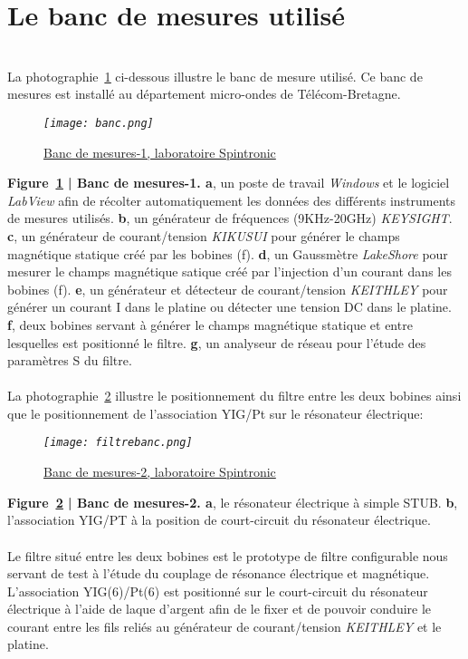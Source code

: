 \documentclass[12pt,fleqn]{book} %
\begin{document}
\section{Le banc de mesures utilisé}
~\\\indent La photographie~\underline{\color{blue}\ref{banc}} ci-dessous illustre le banc de mesure utilisé. Ce banc de mesures est installé au département micro-ondes de Télécom-Bretagne.
\begin{figure}[H]
	\centering
	\itshape
	\texttt{[image: banc.png]}
	\caption{\label{banc} \underline{Banc de mesures-1, laboratoire Spintronic}}
\end{figure}
\noindent\footnotesize  \textbf{Figure~\underline{\color{blue}\ref{banc}} | Banc de mesures-1. a}, un poste de travail \emph{Windows} et le logiciel \emph{LabView} afin de récolter automatiquement les données des différents instruments de mesures utilisés. \textbf{b}, un générateur de fréquences (9KHz-20GHz) \emph{KEYSIGHT}. \textbf{c}, un générateur de courant/tension \emph{KIKUSUI} pour générer le champs magnétique statique créé par les bobines (f). \textbf{d}, un Gaussmètre \emph{LakeShore} pour mesurer le champs magnétique satique créé par l'injection d'un courant dans les bobines (f). \textbf{e}, un générateur et détecteur de courant/tension \emph{KEITHLEY} pour générer un courant I dans le platine ou détecter une tension DC dans le platine. \textbf{f}, deux bobines servant à générer le champs magnétique statique et entre lesquelles est positionné le filtre. \textbf{g}, un analyseur de réseau pour l'étude des paramètres S du filtre.  
~\\\\
\normalsize La photographie~\underline{\color{blue}\ref{filtrebanc}} illustre le positionnement du filtre entre les deux bobines ainsi que le positionnement de l'association YIG/Pt sur le résonateur électrique:
\begin{figure}[H]
	\centering
	\itshape
	\texttt{[image: filtrebanc.png]}
	\caption{\label{filtrebanc} \underline{Banc de mesures-2, laboratoire Spintronic}}
\end{figure}
\noindent\footnotesize  \textbf{Figure~\underline{\color{blue}\ref{filtrebanc}} | Banc de mesures-2. a}, le résonateur électrique à simple STUB. \textbf{b}, l'association YIG/PT à la position de court-circuit du résonateur électrique.
~\\\\
\normalsize Le filtre situé entre les deux bobines est le prototype de filtre configurable nous servant de test à l'étude du couplage de résonance électrique et magnétique. L'association YIG(\unit{6}{\micro\meter})/Pt(\unit{6}{\nano\meter}) est positionné sur le court-circuit du résonateur électrique à l'aide de laque d'argent afin de le fixer et de pouvoir conduire le courant entre les fils reliés au générateur de courant/tension \emph{KEITHLEY} et le platine.
\end{document}
